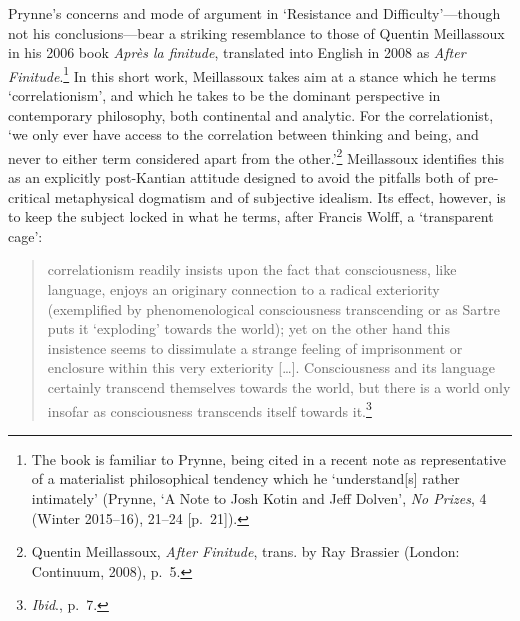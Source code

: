 \documentclass[]{article}
\begin{document}
Prynne’s concerns and mode of argument in ‘Resistance and
Difficulty’—though not his conclusions—bear a striking resemblance to
those of Quentin Meillassoux in his 2006 book \emph{Après la finitude},
translated into English in 2008 as \emph{After Finitude}.\footnote{The
  book is familiar to Prynne, being cited in a recent note as
  representative of a materialist philosophical tendency which he
  ‘understand{[}s{]} rather intimately’ (Prynne, ‘A Note to Josh Kotin
  and Jeff Dolven’, \emph{No Prizes}, 4 (Winter 2015–16), 21–24
  {[}p.~21{]}).} In this short work, Meillassoux takes aim at a stance
which he terms ‘correlationism’, and which he takes to be the dominant
perspective in contemporary philosophy, both continental and analytic.
For the correlationist, ‘we only ever have access to the correlation
between thinking and being, and never to either term considered apart
from the other.’\footnote{Quentin Meillassoux, \emph{After Finitude},
  trans. by Ray Brassier (London: Continuum, 2008), p.~5.} Meillassoux
identifies this as an explicitly post-Kantian attitude designed to avoid
the pitfalls both of pre-critical metaphysical dogmatism and of
subjective idealism. Its effect, however, is to keep the subject locked
in what he terms, after Francis Wolff, a ‘transparent cage’:

\begin{quote}
\singlespacing correlationism readily insists upon the fact that
consciousness, like language, enjoys an originary connection to a
radical exteriority (exemplified by phenomenological consciousness
transcending or as Sartre puts it ‘exploding’ towards the world); yet on
the other hand this insistence seems to dissimulate a strange feeling of
imprisonment or enclosure within this very exteriority {[}\ldots{}{]}.
Consciousness and its language certainly transcend themselves towards
the world, but there is a world only insofar as consciousness transcends
itself towards it.\footnote{\emph{Ibid}., p.~7.}
\end{quote}
\end{document}
